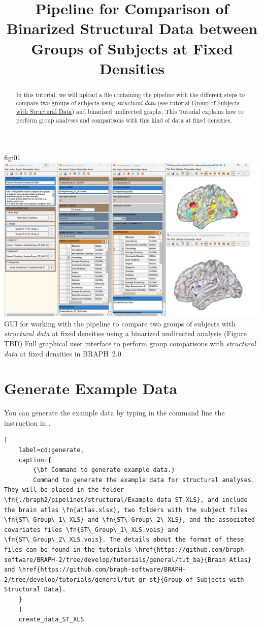 \documentclass[justified]{tufte-handout}
\title[Comparison of Structural Data using BUT]{Pipeline for Comparison of Binarized Structural Data between Groups of Subjects at Fixed Densities}
\begin{document}
\maketitle

\begin{abstract}
\noindent
In this tutorial, we will upload a file containing the pipeline with the different steps to compare two groups of subjects using \emph{structural data} (see tutorial \href{https://github.com/braph-software/BRAPH-2/tree/develop/tutorials/general/tut_gr_st}{Group of Subjects with Structural Data}) and binarized undirected graphs. This Tutorial explains how to perform group analyses and comparisons with this kind of data at fixed densities.
\end{abstract}

\tableofcontents

	{fig:01}
	{\includegraphics{fig01.jpg}}
	{GUI for working with the pipeline to compare two groups of subjects with \emph{structural data} at fixed densities using a binarized undirected analysis (Figure TBD)}
	{
	Full graphical user interface to perform group comparisons with \emph{structural data} at fixed densities in BRAPH~2.0. 
	}

\clearpage

\section{Generate Example Data}

You can generate the example data by typing in the command line the instruction in .
%
\begin{lstlisting}[
	label=cd:generate,
	caption={
		{\bf Command to generate example data.}
		Command to generate the example data for structural analyses. They will be placed in the folder \fn{./braph2/pipelines/structural/Example data ST XLS}, and include the brain atlas \fn{atlas.xlsx}, two folders with the subject files \fn{ST\_Group\_1\_XLS} and \fn{ST\_Group\_2\_XLS}, and the associated covariates files \fn{ST\_Group\_1\_XLS.vois} and \fn{ST\_Group\_2\_XLS.vois}. The details about the format of these files can be found in the tutorials \href{https://github.com/braph-software/BRAPH-2/tree/develop/tutorials/general/tut_ba}{Brain Atlas} and \href{https://github.com/braph-software/BRAPH-2/tree/develop/tutorials/general/tut_gr_st}{Group of Subjects with Structural Data}.
	}
	]
	create_data_ST_XLS
\end{lstlisting}
\end{document}
